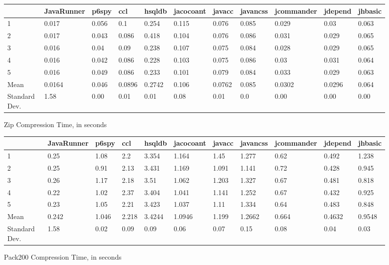 \documentclass{article}
\begin{document}
\begin{figure}
\caption{Zip Compression Time, in seconds}
\begin{sideways}
\begin{tabular}{l l l l l l l l l l l }
	  & JavaRunner & p6spy & ccl & hsqldb & jacocoant & javacc & javancss & jcommander & jdepend & jhbasic \\ \hline
1&	0.017 &	0.056 & 0.1 &	0.254 &	0.115 &	0.076 &	0.085 &	0.029 &	0.03&	0.063 \\
2&  0.017 &	0.043 &	0.086&	0.418 &	0.104 &	0.076 &	0.086 &	0.031 &	0.029&	0.065 \\
3&	0.016 &	0.04  &	0.09 &  0.238 &	0.107 &	0.075 &	0.084 &	0.028 &	0.029&	0.065 \\
4&	0.016 &	0.042 &	0.086&	0.228 &	0.103 &	0.075 &	0.086 &	0.03  &	0.031&	0.064 \\
5&	0.016 &	0.049 &	0.086&	0.233 &	0.101 &	0.079 &	0.084 &	0.033 &	0.029&	0.063 \\
Mean&0.0164&	0.046 &	0.0896&	0.2742&	0.106 &	0.0762&	0.085 &	0.0302&	0.0296&	0.064 \\
Standard Dev.&	1.58&	0.00&	0.01&	0.01&	0.08&	0.01&	0.0	&0.00&	0.00&	0.00 
\end{tabular}
\end{sideways}
\end{figure}

\begin{figure}
\caption{Pack200 Compression Time, in seconds}
\begin{sideways}
\begin{tabular}{l l l l l l l l l l l }
	  & JavaRunner & p6spy & ccl & hsqldb & jacocoant & javacc & javancss & jcommander & jdepend & jhbasic \\ \hline
1 &	0.25	&1.08&	2.2&	3.354&	1.164&	1.45&	1.277&	0.62&	0.492&	1.238 \\
2&	0.25&	0.91&	2.13&	3.431&	1.169&	1.091&	1.141&	0.72&	0.428&	0.945\\
3&	0.26&	1.17&	2.18&	3.51&	1.062&	1.203&	1.327&	0.67&	0.481&	0.818\\
4&	0.22&	1.02&	2.37&	3.404&	1.041&	1.141&	1.252&	0.67&	0.432&	0.925\\
5&	0.23&	1.05&	2.21&	3.423&	1.037&	1.11&	1.334&	0.64&	0.483&	0.848\\
Mean&	0.242&	1.046&	2.218&	3.4244&	1.0946&	1.199&	1.2662&	0.664&	0.4632&	0.9548\\
Standard Dev.&	1.58&	0.02&	0.09&	0.09&	0.06&	0.07&	0.15&	0.08&	0.04&	0.03 
\end{tabular}
\end{sideways}
\end{figure}
\end{document}
